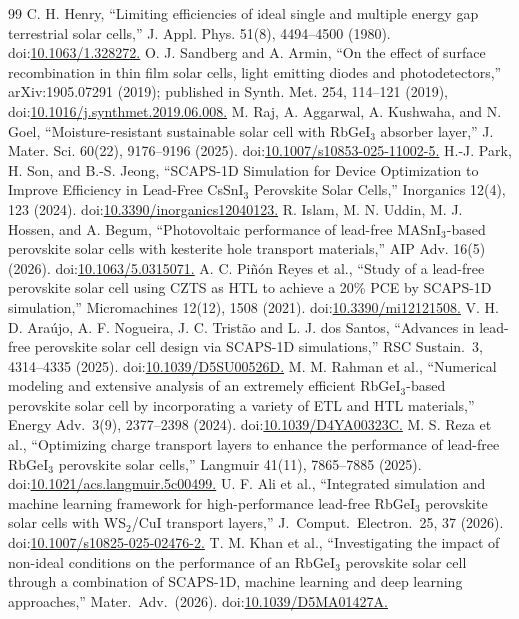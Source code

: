 \documentclass[aip,jap,amsmath,amssymb,preprint]{revtex4-2}
\begin{document}
\begin{thebibliography}{99}
 C. H. Henry, ``Limiting efficiencies of ideal single and multiple energy gap terrestrial solar cells,'' J. Appl. Phys. 51(8), 4494--4500 (1980). doi:\url{10.1063/1.328272.}
 O. J. Sandberg and A. Armin, ``On the effect of surface recombination in thin film solar cells, light emitting diodes and photodetectors,'' arXiv:1905.07291 (2019); published in Synth. Met. 254, 114--121 (2019), doi:\url{10.1016/j.synthmet.2019.06.008.}
 M. Raj, A. Aggarwal, A. Kushwaha, and N. Goel, ``Moisture-resistant sustainable solar cell with RbGeI$_{3}$ absorber layer,'' J. Mater. Sci. 60(22), 9176--9196 (2025). doi:\url{10.1007/s10853-025-11002-5.}
 H.-J. Park, H. Son, and B.-S. Jeong, ``SCAPS-1D Simulation for Device Optimization to Improve Efficiency in Lead-Free CsSnI$_{3}$ Perovskite Solar Cells,'' Inorganics 12(4), 123 (2024). doi:\url{10.3390/inorganics12040123.}
 R. Islam, M. N. Uddin, M. J. Hossen, and A. Begum, ``Photovoltaic performance of lead-free MASnI$_{3}$-based perovskite solar cells with kesterite hole transport materials,'' AIP Adv. 16(5) (2026). doi:\url{10.1063/5.0315071.}
 A. C. Piñón Reyes et al., ``Study of a lead-free perovskite solar cell using CZTS as HTL to achieve a 20\% PCE by SCAPS-1D simulation,'' Micromachines 12(12), 1508 (2021). doi:\url{10.3390/mi12121508.}
 V. H. D. Ara\'ujo, A. F. Nogueira, J. C. Trist\~ao and L. J. dos Santos, ``Advances in lead-free perovskite solar cell design via SCAPS-1D simulations,'' RSC Sustain.\ 3, 4314--4335 (2025). doi:\url{10.1039/D5SU00526D.}
 M. M. Rahman et al., ``Numerical modeling and extensive analysis of an extremely efficient RbGeI$_{3}$-based perovskite solar cell by incorporating a variety of ETL and HTL materials,'' Energy Adv.\ 3(9), 2377--2398 (2024). doi:\url{10.1039/D4YA00323C.}
 M. S. Reza et al., ``Optimizing charge transport layers to enhance the performance of lead-free RbGeI$_{3}$ perovskite solar cells,'' Langmuir 41(11), 7865--7885 (2025). doi:\url{10.1021/acs.langmuir.5c00499.}
 U. F. Ali et al., ``Integrated simulation and machine learning framework for high-performance lead-free RbGeI$_{3}$ perovskite solar cells with WS$_{2}$/CuI transport layers,'' J.\ Comput.\ Electron.\ 25, 37 (2026). doi:\url{10.1007/s10825-025-02476-2.}
 T. M. Khan et al., ``Investigating the impact of non-ideal conditions on the performance of an RbGeI$_{3}$ perovskite solar cell through a combination of SCAPS-1D, machine learning and deep learning approaches,'' Mater.\ Adv.\ (2026). doi:\url{10.1039/D5MA01427A.}

\end{thebibliography}
\end{document}
